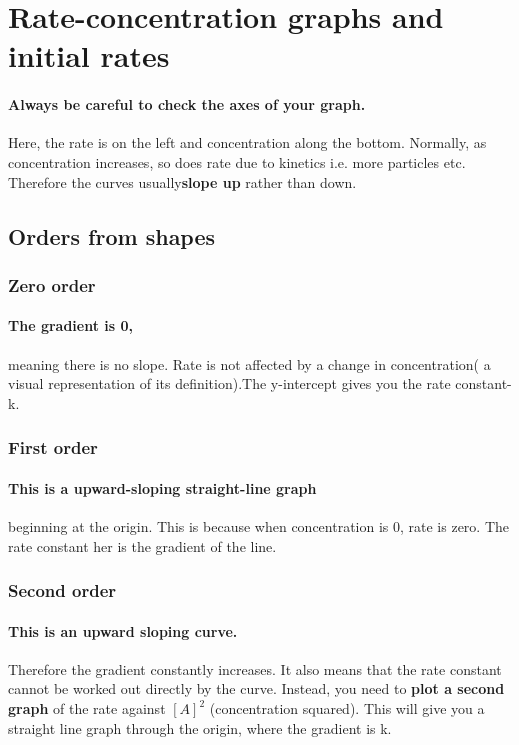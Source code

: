 \section{Rate-concentration graphs and initial rates}
\paragraph{Always be careful to check the axes of your graph.}Here, the rate is on the left and concentration along the bottom. Normally, as concentration increases, so does rate due to kinetics i.e. more particles etc. Therefore the curves usually\textbf{slope up} rather than down.
\subsection{Orders from shapes}
\subsubsection{Zero order}
\paragraph{The gradient is 0,}meaning there is no slope. Rate is not affected by a change in concentration( a visual representation of its definition).The y-intercept gives you the rate constant-k.
\subsubsection{First order}
\paragraph{This is a upward-sloping straight-line graph}beginning at the origin. This is because when concentration is 0, rate is zero. The rate constant her is the gradient of the line.
\subsubsection{Second order}
\paragraph{This is an upward sloping curve.}Therefore the gradient constantly increases. It also means that the rate constant cannot be worked out directly by the curve. Instead, you need to \textbf{plot a second graph} of the rate against $[A]^2$ (concentration squared). This will give you a straight line graph through the origin, where the gradient is k.
